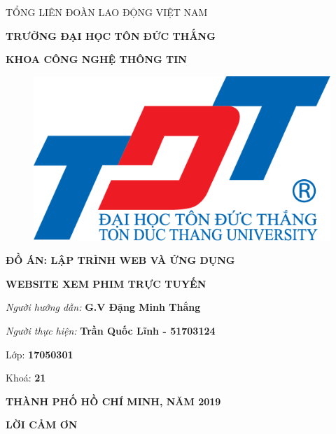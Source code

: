 \documentclass{report}
\begin{document}
\changefontsizes[14pt]{12pt}
\centerline{TỔNG LIÊN ĐOÀN LAO ĐỘNG VIỆT NAM}

\changefontsizes[14pt]{11pt}
\centerline{\textbf{TRƯỜNG ĐẠI HỌC TÔN ĐỨC THẮNG}}
\centerline{\textbf{KHOA CÔNG NGHỆ THÔNG TIN}}

\begin{center}
    \begin{figure}[htp]
    \begin{center}
     \includegraphics[scale=.2]{logo}
    \end{center}
    \end{figure}
\end{center}

\changefontsizes{16pt}
\centerline{\textbf{ĐỒ ÁN: LẬP TRÌNH WEB VÀ ỨNG DỤNG}}
\vspace{1.5cm}
\changefontsizes{24pt}
\centerline{\textbf{WEBSITE XEM PHIM TRỰC TUYẾN}}

\vspace{4cm}
\begin{flushright}
\renewcommand{\baselinestretch}{0.05}
\changefontsizes{14pt}
\textit{Người hướng dẫn: }\textbf{G.V Đặng Minh Thắng}
\setlength{\parskip}{0.5em}

\textit{Người thực hiện: }\textbf{Trần Quốc Lĩnh - 51703124}
\setlength{\parskip}{0.5em}

Lớp: \textbf{17050301}
\setlength{\parskip}{0.5em}

Khoá: \textbf{21}
\setlength{\parskip}{0.5em}

\end{flushright}

\vspace{1cm}
\changefontsizes{14pt}
\centerline{\textbf{THÀNH PHỐ HỒ CHÍ MINH, NĂM 2019}}


\newpage
\changefontsizes{16pt}
\centerline{\textbf{LỜI CẢM ƠN}}
\end{document}
